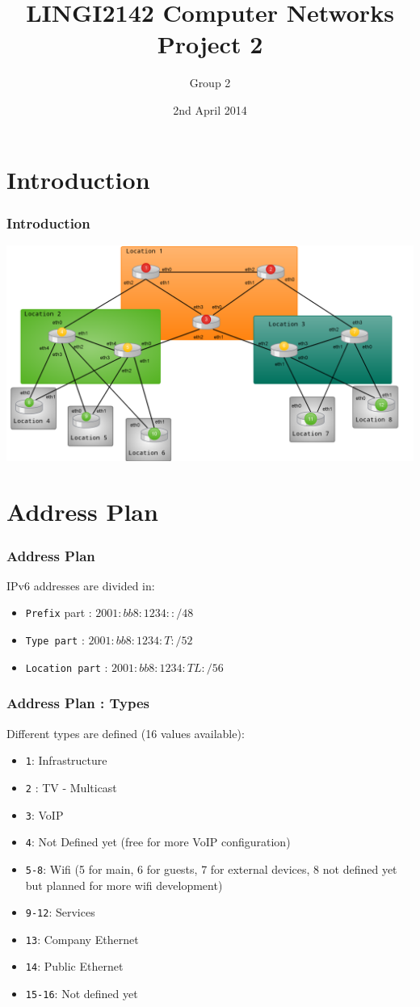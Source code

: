 \documentclass[usenames,dvipsnames]{beamer}
\title[LINGI2142 Project 2]{LINGI2142 Computer Networks \\ Project 2} %
\author[Group 2] {Group 2} %
\institute[INGI] %
{
Université Catholique de Louvain - INGI\\ %
\medskip
}
\date{2nd April 2014} %
\begin{document}
\begin{frame}
\titlepage %
\end{frame}

\section{Introduction}
\begin{frame}
\frametitle{Introduction}
\centering \includegraphics[scale=0.20]{network.png}

\end{frame}

\section{Address Plan}
\begin{frame}
\frametitle{Address Plan}
IPv6 addresses are divided in:
\begin{itemize}
\item \texttt{Prefix} part : $2001:bb8:1234::/48$
\item \texttt{Type part} : $2001:bb8:1234:T:/52$
\item \texttt{Location part} : $2001:bb8:1234:TL:/56$
\end{itemize}
\end{frame}

\begin{frame}
\frametitle{Address Plan : Types}
Different types are defined (16 values available): 
\begin{itemize}
\item \texttt{1}: Infrastructure
\item \texttt{2} : TV - Multicast
\item \texttt{3}: VoIP
\item \texttt{4}: Not Defined yet (free for more VoIP configuration)
\item \texttt{5-8}: Wifi (5 for main, 6 for guests, 7 for external devices, 8 not defined yet but planned for more wifi development)
\item \texttt{9-12}: Services
\item \texttt{13}: Company Ethernet
\item \texttt{14}: Public Ethernet
\item \texttt{15-16}: Not defined yet
\end{itemize}
\end{frame}
\end{document}
